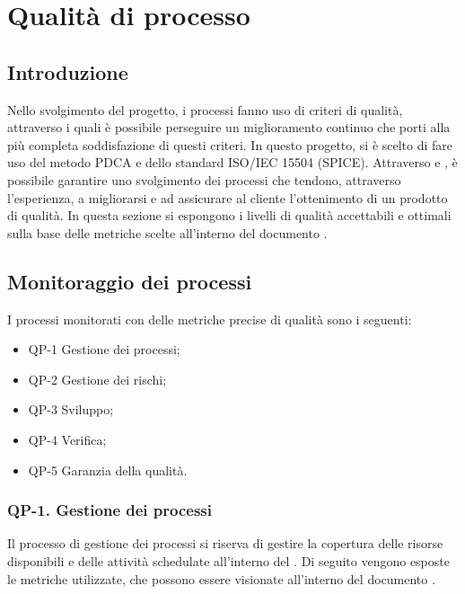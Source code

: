 \section{Qualità di processo}

\subsection{Introduzione}

Nello svolgimento del progetto, i processi fanno uso di criteri di qualità, attraverso i quali è possibile perseguire un miglioramento continuo che porti alla più completa soddisfazione di questi criteri.
\newline
In questo progetto, si è scelto di fare uso del metodo PDCA e dello standard ISO/IEC 15504 (SPICE). Attraverso  e , è possibile garantire uno svolgimento dei processi che tendono, attraverso l'esperienza, a migliorarsi e ad assicurare al cliente l'ottenimento di un prodotto di qualità.
\newline
In questa sezione si espongono i livelli di qualità accettabili e ottimali sulla base delle metriche scelte all'interno del documento .

\subsection{Monitoraggio dei processi}

I processi monitorati con delle metriche precise di qualità sono i seguenti:

\begin{itemize}
	\item QP-1 Gestione dei processi;
	\item QP-2 Gestione dei rischi;
 	\item QP-3 Sviluppo;
	\item QP-4 Verifica;
	\item QP-5 Garanzia della qualità.
\end{itemize}

	\subsubsection{QP-1. Gestione dei processi}

		Il processo di gestione dei processi si riserva di gestire la copertura delle risorse disponibili e delle attività schedulate all'interno del .
		\newline
		Di seguito vengono esposte le metriche utilizzate, che possono essere visionate all'interno del documento .

